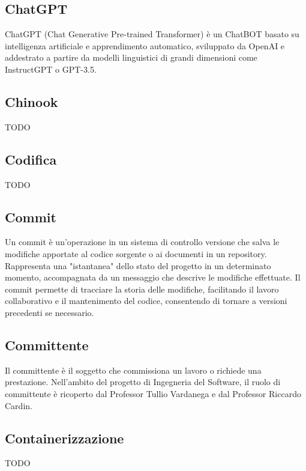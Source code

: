 \vspace{2em}
\subsection*{ChatGPT}
ChatGPT (Chat Generative Pre-trained Transformer) è un ChatBOT basato su intelligenza artificiale e apprendimento automatico, sviluppato da OpenAI e addestrato a partire da modelli linguistici di grandi dimensioni come InstructGPT o GPT-3.5.

\vspace{2em}
\subsection*{Chinook}
TODO

\vspace{2em}
\subsection*{Codifica}
TODO

\vspace{2em}
\subsection*{Commit}
Un commit è un'operazione in un sistema di controllo versione che salva le modifiche apportate al codice sorgente o ai documenti in un repository. Rappresenta una "istantanea" dello stato del progetto in un determinato momento, accompagnata da un messaggio che descrive le modifiche effettuate. Il commit permette di tracciare la storia delle modifiche, facilitando il lavoro collaborativo e il mantenimento del codice, consentendo di tornare a versioni precedenti se necessario.

\vspace{2em}
\subsection*{Committente}
Il committente è il soggetto che commissiona un lavoro o richiede una prestazione. Nell’ambito del progetto di Ingegneria del Software, il ruolo di committente è ricoperto dal Professor Tullio Vardanega e dal Professor Riccardo Cardin.

\vspace{2em}
\subsection*{Containerizzazione}
TODO


